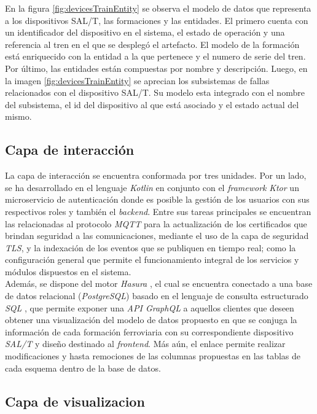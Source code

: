 \documentclass[a4paper]{IEEEtran}
\begin{document}
En la figura \ref{fig:devicesTrainEntity} se observa el modelo de datos que representa a los dispositivos SAL/T, las formaciones y las entidades. 
El primero cuenta con un identificador del dispositivo en el sistema, el estado de operación y una referencia al tren en el que se desplegó el artefacto. 
El modelo de la formación está enriquecido con la entidad a la que pertenece y el numero de serie del tren. 
Por último, las entidades están compuestas por nombre y descripción.
Luego, en la imagen \ref{fig:devicesTrainEntity} se aprecian los subsistemas de fallas relacionados con el dispositivo SAL/T.
Su modelo esta integrado con el nombre del subsistema, el id del dispositivo al que está asociado y el estado actual del mismo. 

\subsection{Capa de interacción}

La capa de interacción se encuentra conformada por tres unidades. Por un lado, se ha desarrollado en el lenguaje \textit{Kotlin} \cite{b12} en conjunto con el \textit{framework} \textit{Ktor} \cite{b13} un microservicio de autenticación donde es posible la gestión de los usuarios con sus respectivos roles y también el \textit{backend}. Entre sus tareas principales se encuentran las relacionadas al protocolo \textit{MQTT} para la actualización de los certificados que brindan seguridad a las comunicaciones, mediante el uso de la capa de seguridad \textit{TLS}, y la indexación de los eventos que se publiquen en tiempo real; como la configuración general que permite el funcionamiento integral de los servicios y módulos dispuestos en el sistema. \\

Además, se dispone del motor \textit{Hasura} \cite{b14}, el cual se encuentra conectado a una base de datos relacional (\textit{PostgreSQL}) basado en el lenguaje de consulta estructurado \textit{SQL} \cite{b15} , que permite exponer una \textit{API GraphQL} \cite{b16} a aquellos clientes que deseen obtener una visualización del modelo de datos propuesto en que se conjuga la información de cada formación ferroviaria con su correspondiente dispositivo \textit{SAL/T} y diseño destinado al \textit{frontend}. Más aún, el enlace permite realizar modificaciones y hasta remociones de las columnas propuestas en las tablas de cada esquema dentro de la base de datos.


\subsection{Capa de visualizacion}
\end{document}

